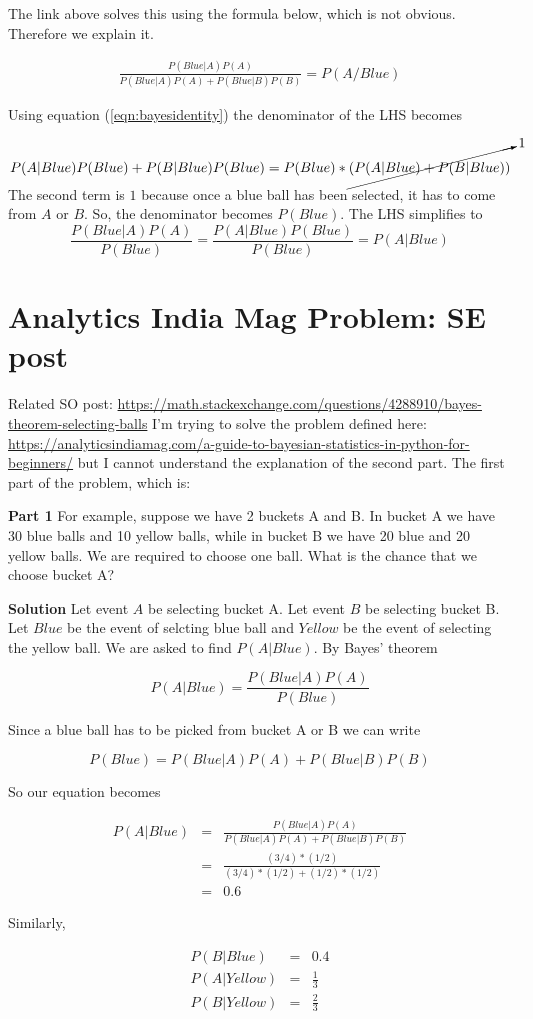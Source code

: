 \documentclass{article}
\newcommand{\beq}{\begin{equation}}
\newcommand{\eeq}{\end{equation}}
\newcommand{\ber}{\begin{eqnarray}}
\newcommand{\eer}{\end{eqnarray}}
\begin{document}
The link above solves this using the formula below, which is not obvious. Therefore we explain it.

\ber
\frac{P(Blue|A)P(A)}{P(Blue|A)P(A) + P(Blue|B)P(B)} = P(A/Blue)
\eer

Using equation (\ref{eqn:bayesidentity}) the denominator of the LHS becomes

\beq
P(A|Blue)P(Blue) + P(B|Blue)P(Blue) = P(Blue)*\cancelto{1}{(P(A|Blue) + P(B|Blue))}
\eeq
The second term is $1$ because once a blue ball has been selected, it has to come from $A$ or $B$. So, the denominator becomes $P(Blue)$. The LHS simplifies to
\beq
\frac{P(Blue|A)P(A)}{P(Blue)} = \frac{P(A|Blue)P(Blue)}{P(Blue)} = P(A|Blue)
\eeq
\section{Analytics India Mag Problem: SE post}
Related SO post: \url{https://math.stackexchange.com/questions/4288910/bayes-theorem-selecting-balls}
I'm trying to solve the problem defined here: \url{https://analyticsindiamag.com/a-guide-to-bayesian-statistics-in-python-for-beginners/} but I cannot understand the explanation of the second part. The first part of the problem, which is:

\textbf{Part 1}
For example, suppose we have 2 buckets A and B. In bucket A we have 30 blue balls and 10 yellow balls, while in bucket B we have 20 blue and 20 yellow balls. We are required to choose one ball. What is the chance that we choose bucket A?


{\textbf{Solution}} Let event $A$ be selecting bucket A. Let event $B$ be selecting bucket B. Let $Blue$ be the event of selcting blue ball and $Yellow$ be the event of selecting the yellow ball.  We are asked to find $P(A|Blue)$. By Bayes' theorem

\beq
P(A|Blue) = \frac{P(Blue|A)P(A)}{P(Blue)}
\eeq

Since a blue ball has to be picked from bucket A or B we can write

\beq
P(Blue) = P(Blue|A)P(A) + P(Blue|B)P(B)
\eeq

So our equation becomes

\ber
P(A|Blue) &=& \frac{P(Blue|A)P(A)}{P(Blue|A)P(A) + P(Blue|B)P(B)}\\
          &=& \frac{(3/4)*(1/2)}{(3/4)*(1/2)+(1/2)*(1/2)} \\
          &=& 0.6
\eer

Similarly,

\ber
P(B|Blue)   &=& 0.4 \\
P(A|Yellow) &=& \frac{1}{3}\\
P(B|Yellow) &=& \frac{2}{3}
\eer
\end{document}
